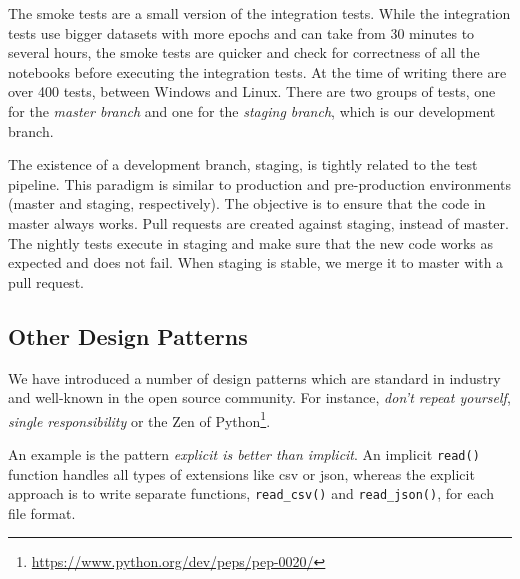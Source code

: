 The smoke tests are a small version of the integration tests. While the integration tests
use bigger datasets with more epochs and can take from 30 minutes to several hours, the smoke tests are quicker and
check for correctness of all the notebooks before executing the integration tests.
At the time of writing there are over 400 tests, between Windows and Linux. There are two groups of tests,
one for the {\em master branch} and one for the {\em staging branch}, which is our development branch.

The existence of a development branch, staging, is tightly related to the test pipeline. This paradigm is similar to
production and pre-production environments (master and staging, respectively).
The objective is to ensure that the code in master always works. Pull requests are created 
against staging, instead of master. The nightly tests execute in staging and make sure that the new code 
works as expected and does not fail. When staging is stable, we merge it to master with a pull request.  


\subsection{Other Design Patterns}

We have introduced a number of design patterns which are standard in industry and well-known
in the open source community. For instance, \textit{don't repeat yourself}, \textit{single
responsibility} or the Zen of Python\footnote{\url{https://www.python.org/dev/peps/pep-0020/}}. 

An example is the pattern \textit{explicit is better than implicit}.
An implicit \verb!read()! function handles all types of extensions like csv or json,  
%
%
whereas the explicit approach is to write separate functions, \verb!read_csv()! and \verb!read_json()!, for each file format. 



